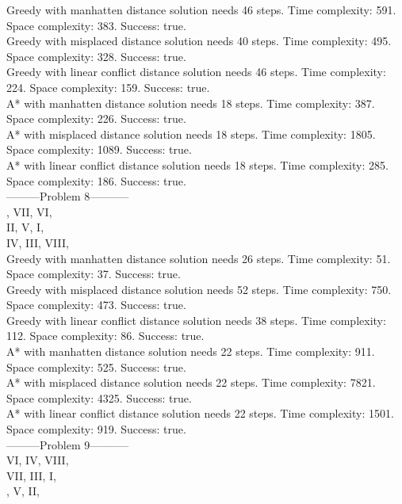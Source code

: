 \documentclass[paper=a4, fontsize=11pt]{scrartcl} %
\numberwithin{equation}{section} %
\numberwithin{figure}{section} %
\numberwithin{table}{section} %
\begin{document}
Greedy with manhatten distance solution needs 46 steps. Time complexity: 591. Space complexity: 383. Success: true.\\ 
Greedy with misplaced distance solution needs 40 steps. Time complexity: 495. Space complexity: 328. Success: true.\\ 
Greedy with linear conflict distance solution needs 46 steps. Time complexity: 224. Space complexity: 159. Success: true.\\ 
A* with manhatten distance solution needs 18 steps. Time complexity: 387. Space complexity: 226. Success: true.\\ 
A* with misplaced distance solution needs 18 steps. Time complexity: 1805. Space complexity: 1089. Success: true.\\ 
A* with linear conflict distance solution needs 18 steps. Time complexity: 285. Space complexity: 186. Success: true.\\ 
---------Problem 8-----------\\ 
, VII, VI, \\ 
II, V, I, \\ 
IV, III, VIII,\\  

Greedy with manhatten distance solution needs 26 steps. Time complexity: 51. Space complexity: 37. Success: true.\\ 
Greedy with misplaced distance solution needs 52 steps. Time complexity: 750. Space complexity: 473. Success: true.\\ 
Greedy with linear conflict distance solution needs 38 steps. Time complexity: 112. Space complexity: 86. Success: true.\\ 
A* with manhatten distance solution needs 22 steps. Time complexity: 911. Space complexity: 525. Success: true.\\ 
A* with misplaced distance solution needs 22 steps. Time complexity: 7821. Space complexity: 4325. Success: true.\\ 
A* with linear conflict distance solution needs 22 steps. Time complexity: 1501. Space complexity: 919. Success: true.\\ 
---------Problem 9-----------\\ 
VI, IV, VIII, \\ 
VII, III, I, \\ 
, V, II, \\ 
\end{document}
